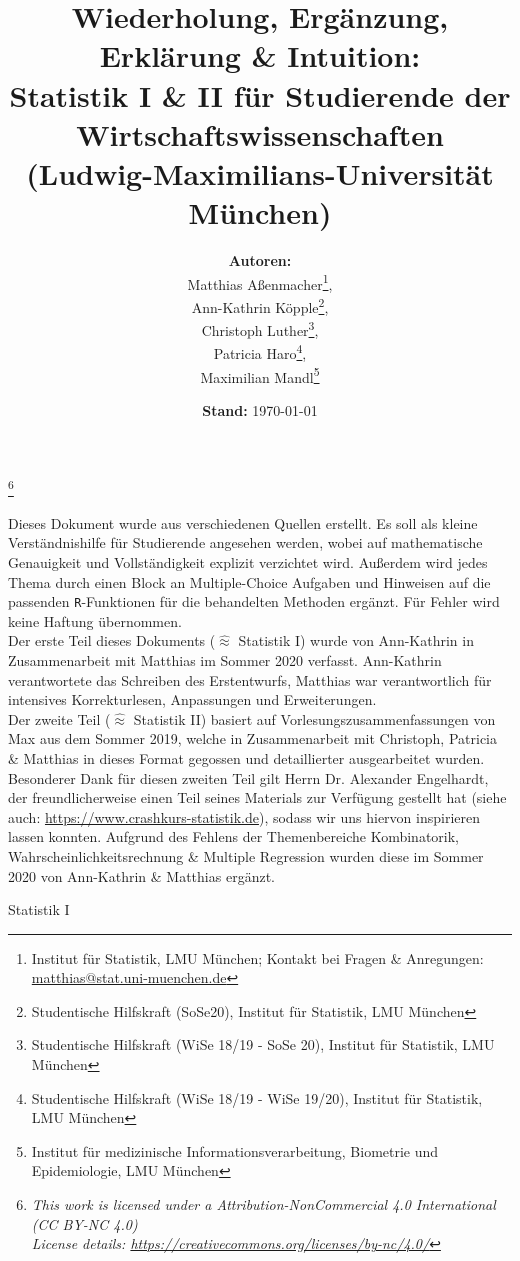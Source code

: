 \documentclass[a4paper]{article}
\title{%
  \large Wiederholung, Ergänzung, Erklärung \& Intuition:\\
  \Large Statistik I \& II für Studierende der Wirtschaftswissenschaften\\
  \large (Ludwig-Maximilians-Universität München)
}
\date{\textbf{Stand:} \today}
\author{\textbf{Autoren:}\\ 
Matthias Aßenmacher\thanks{Institut für Statistik, LMU München; Kontakt bei Fragen \& Anregungen: \url{matthias@stat.uni-muenchen.de}},\\
Ann-Kathrin Köpple\thanks{Studentische Hilfskraft (SoSe20), Institut für Statistik, LMU München},\\
Christoph Luther\thanks{Studentische Hilfskraft (WiSe 18/19 - SoSe 20), Institut für Statistik, LMU München},\\
Patricia Haro\thanks{Studentische Hilfskraft (WiSe 18/19 - WiSe 19/20), Institut für Statistik, LMU München},\\
Maximilian Mandl\thanks{Institut für medizinische Informationsverarbeitung, Biometrie und Epidemiologie, LMU München\vspace{.25cm}}}
\newcommand\blfootnote[1]{%
  \begingroup
  \renewcommand\thefootnote{}\footnote{#1}%
  \addtocounter{footnote}{-1}%
  \endgroup
}
\begin{document}
\maketitle

\blfootnote{
\hspace{-0.75cm} 
\textit{\small 
This work is licensed under a Attribution-NonCommercial 4.0 International (CC BY-NC 4.0)\\          
License details: \url{https://creativecommons.org/licenses/by-nc/4.0/}}
}

\noindent Dieses  Dokument wurde aus verschiedenen Quellen erstellt. Es soll als kleine Verständnishilfe für Studierende angesehen werden, wobei auf mathematische Genauigkeit und Vollständigkeit explizit verzichtet wird. Außerdem wird jedes Thema durch einen Block an Multiple-Choice Aufgaben und Hinweisen auf die passenden \texttt{R}-Funktionen für die behandelten Methoden ergänzt. Für Fehler wird keine Haftung übernommen.\\

\noindent Der erste Teil dieses Dokuments ($\widehat \approx$ Statistik I) wurde von Ann-Kathrin in Zusammenarbeit mit Matthias im Sommer 2020 verfasst. Ann-Kathrin verantwortete das Schreiben des Erstentwurfs, Matthias war verantwortlich für intensives Korrekturlesen, Anpassungen und Erweiterungen.\\
Der zweite Teil ($\widehat \approx$ Statistik II) basiert auf Vorlesungszusammenfassungen von Max aus dem Sommer 2019, welche in Zusammenarbeit mit Christoph, Patricia \& Matthias in dieses Format gegossen und detaillierter ausgearbeitet wurden. Besonderer Dank für diesen zweiten Teil gilt Herrn Dr. Alexander Engelhardt, der freundlicherweise einen Teil seines Materials zur Verfügung gestellt hat (siehe auch: \url{https://www.crashkurs-statistik.de}), sodass wir uns hiervon inspirieren lassen konnten. Aufgrund des Fehlens der Themenbereiche Kombinatorik, Wahrscheinlichkeitsrechnung \& Multiple Regression wurden diese im Sommer 2020 von Ann-Kathrin \& Matthias ergänzt.

\clearpage

\tableofcontents

\clearpage

\hspace{0pt}
\vfill
\begin{center}
    {\Huge Statistik I}
\end{center}
\vfill
\hspace{0pt}

\clearpage
\end{document}
